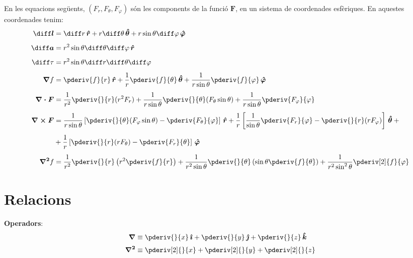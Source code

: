 \documentclass[catalan,a4paper,twoside,11pt]{article}
\begin{document}
\renewcommand{\va}{\ensuremath{\,\boldsymbol{\hat{r}}}}
\renewcommand{\vb}{\ensuremath{\,\boldsymbol{\hat{\theta}}}}
\renewcommand{\vc}{\ensuremath{\,\boldsymbol{\hat{\varphi}}}}
En les equacions seg\"{u}ents, $(F_r,F_\theta,F_\varphi)$  s\'{o}n
les components de la funci\'{o}  $\boldsymbol{F}$, en un sistema de
coordenades esf\`{e}riques. En aquestes coordenades tenim:
\begin{align}
    \boldsymbol{\diff l} &= \diff r \va + r\diff\theta \vb + r \sin\theta\diff \varphi \vc\\[1ex]
    \boldsymbol{\diff a} &= r^2 \sin\theta \diff \theta \diff \varphi \va\\[1ex]
    \diff\tau &= r^2 \sin\theta\diff r \diff \theta \diff \varphi\\[1ex]
    \boldsymbol{\nabla}f &= \pderiv{f}{r}\va + \frac{1}{r}\pderiv{f}{\theta}\vb
    + \frac{1}{r\sin\theta}\pderiv{f}{\varphi}\vc\\[1ex]
    \boldsymbol{\nabla\cdot F} &= \frac{1}{r^2}\pderiv{}{r}(r^2 F_r) +
    \frac{1}{r\sin\theta}\pderiv{}{\theta}(F_\theta\sin\theta)+
    \frac{1}{r\sin\theta}\pderiv{F_\varphi}{\varphi}\\[1ex]
    \boldsymbol{\nabla\times F} &= \frac{1}{r\sin\theta}\left[\pderiv{}{\theta}
    (F_\varphi\sin\theta)-\pderiv{F_\theta}{\varphi}\right]\va +
    \frac{1}{r}\left[\frac{1}{\sin\theta}\pderiv{F_r}{\varphi}-
    \pderiv{}{r}(r F_\varphi)\right]\vb +{} \nonumber \\[1ex]
     &+\frac{1}{r}\left[\pderiv{}{r}(r F_\theta)-\pderiv{F_r}{\theta}\right]\vc\\[1ex]
    \boldsymbol{\nabla^2}f &= \frac{1}{r^2}\pderiv{}{r}\left(r^2\pderiv{f}{r}
    \right) + \frac{1}{r^2\sin\theta}\pderiv{}{\theta}\left(\sin\theta\pderiv{f}{\theta}\right) +
    \frac{1}{r^2\sin^2\theta}\pderiv[2]{f}{\varphi}
\end{align}

\section{Relacions}

\textbf{Operadors}:
\renewcommand{\va}{\ensuremath{\,\boldsymbol{\hat{\imath}}}}
\renewcommand{\vb}{\ensuremath{\,\boldsymbol{\hat{\jmath}}}}
\renewcommand{\vc}{\ensuremath{\,\boldsymbol{\hat{k}}}}
\begin{align}
    \boldsymbol{\nabla} &\equiv \pderiv{}{x}\va + \pderiv{}{y}\vb
    + \pderiv{}{z}\vc\\[0.5ex]
    \boldsymbol{\nabla^2} &\equiv \pderiv[2]{}{x} + \pderiv[2]{}{y}+ \pderiv[2]{}{z}
\end{align}
\end{document}
